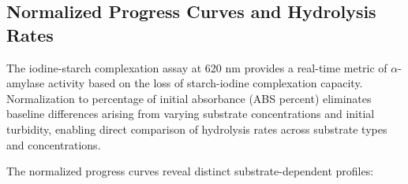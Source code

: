 \documentclass[
  12pt,
]{article}
\begin{document}
\subsection{Normalized Progress Curves and Hydrolysis
Rates}\label{normalized-progress-curves-and-hydrolysis-rates}

The iodine-starch complexation assay at 620 nm provides a real-time
metric of \(\alpha\)-amylase activity based on the loss of starch-iodine
complexation capacity. Normalization to percentage of initial absorbance
(ABS percent) eliminates baseline differences arising from varying
substrate concentrations and initial turbidity, enabling direct
comparison of hydrolysis rates across substrate types and
concentrations.

The normalized progress curves reveal distinct substrate-dependent
profiles:
\end{document}
